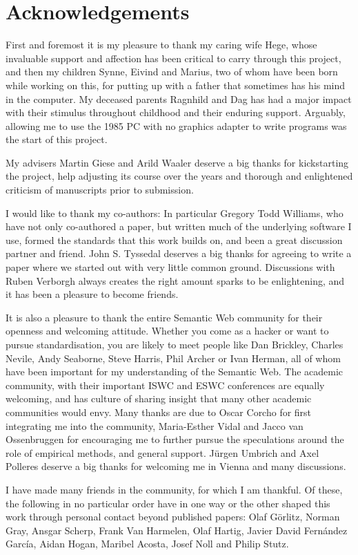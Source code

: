 \section*{Acknowledgements}

First and foremost it is my pleasure to thank my caring wife Hege,
whose invaluable support and affection has been critical to carry
through this project, and then my children Synne, Eivind and Marius,
two of whom have been born while working on this, for putting up with
a father that sometimes has his mind in the computer. My deceased
parents Ragnhild and Dag has had a major impact with their stimulus
throughout childhood and their enduring support. Arguably, allowing me
to use the 1985 PC with no graphics adapter to write programs was the
start of this project.

My advisers Martin Giese and Arild Waaler deserve a big thanks for
kickstarting the project, help adjusting its course over the years and
thorough and enlightened criticism of manuscripts prior to submission.

I would like to thank my co-authors: In particular Gregory Todd
Williams, who have not only co-authored a paper, but written much of
the underlying software I use, formed the standards that this work
builds on, and been a great discussion partner and friend. John
S. Tyssedal deserves a big thanks for agreeing to write a paper where
we started out with very little common ground. Discussions with Ruben
Verborgh always creates the right amount sparks to be enlightening,
and it has been a pleasure to become friends.

It is also a pleasure to thank the entire Semantic Web community for
their openness and welcoming attitude. Whether you come as a hacker
or want to pursue standardisation, you are likely to meet people like
Dan Brickley, Charles Nevile, Andy Seaborne, Steve Harris, Phil Archer
or Ivan Herman, all of whom have been important for my understanding
of the Semantic Web. The academic community, with their important ISWC
and ESWC conferences are equally welcoming, and has culture of sharing
insight that many other academic communities would envy. Many thanks
are due to Oscar Corcho for first integrating me into the community,
Maria-Esther Vidal and Jacco van Ossenbruggen for encouraging me to
further pursue the speculations around the role of empirical methods,
and general support. Jürgen Umbrich and Axel Polleres deserve a big
thanks for welcoming me in Vienna and many discussions.

I have made many friends in the community, for which I am thankful. Of
these, the following in no particular order have in one way or the
other shaped this work through personal contact beyond published
papers: Olaf Görlitz, Norman Gray, Ansgar Scherp, Frank Van Harmelen,
Olaf Hartig, Javier David Fernández García, Aidan Hogan, Maribel
Acosta, Josef Noll and Philip Stutz.

